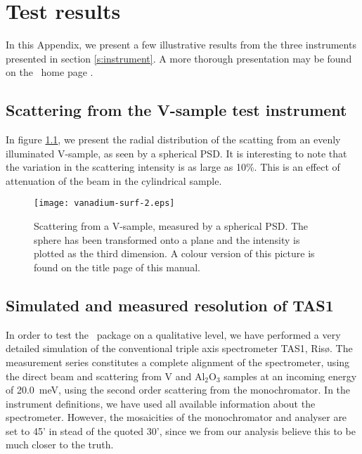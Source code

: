 
\chapter{Test results}
\label{testresults}

In this Appendix, we present a few illustrative
results from the three instruments presented in 
section \ref{s:instrument}. A more thorough presentation
may be found on the \MCS\ home page \cite{mcstas_webpage}.

\section{Scattering from the V-sample test instrument}
\label{s:vanadium-result}

In figure \ref{f:V-results}, we present the radial distribution 
of the scatting from an evenly illuminated V-sample,
as seen by a spherical PSD.
It is interesting to note that the variation in the
scattering intensity is as large as 10\%. This is an effect
of attenuation of the beam in the cylindrical sample.

\begin{figure}
  \begin{center}
    \texttt{[image: vanadium-surf-2.eps]}
  \end{center}
\caption{Scattering from a V-sample, measured by a spherical
  PSD. The sphere has been transformed onto a plane and the intensity is
  plotted as the third dimension. A colour version of this picture is
  found on the title page of this manual.}
\label{f:V-results}
\end{figure}

\section{Simulated and measured resolution of TAS1}
\label{data:TAS1}

In order to test the \MCS\ package on a qualitative level,
we have performed a very detailed simulation of the conventional
triple axis spectrometer TAS1, Ris\o . The measurement series
constitutes a complete alignment of the spectrometer,
using the direct beam and scattering from V and Al$_2$O$_3$
samples at an incoming energy of 20.0~meV, using the second order
scattering from the monochromator. 
In the instrument definitions, we have used all available
information about the spectrometer. However, the
mosaicities of the monochromator and analyser are set
to 45' in stead of the quoted 30', since we from our
analysis believe this to be much closer to the truth.

